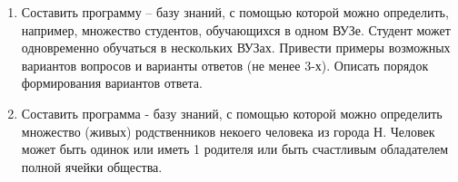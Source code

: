 \documentclass[../main.tex]{subfiles}
\begin{document}
	\begin{enumerate}[1)]
		\item 
			Составить программу – базу знаний, с помощью которой можно определить, например, множество студентов, обучающихся в одном ВУЗе. Студент может одновременно обучаться в нескольких ВУЗах. Привести примеры возможных вариантов вопросов и варианты ответов (не менее 3-х). Описать порядок формирования вариантов ответа.
		\item
			Составить программа - базу знаний, с помощью которой можно определить множество (живых) родственников некоего человека из города Н.
			Человек может быть одинок или иметь 1 родителя или быть счастливым обладателем полной ячейки общества.
	\end{enumerate}
	
\end{document}
